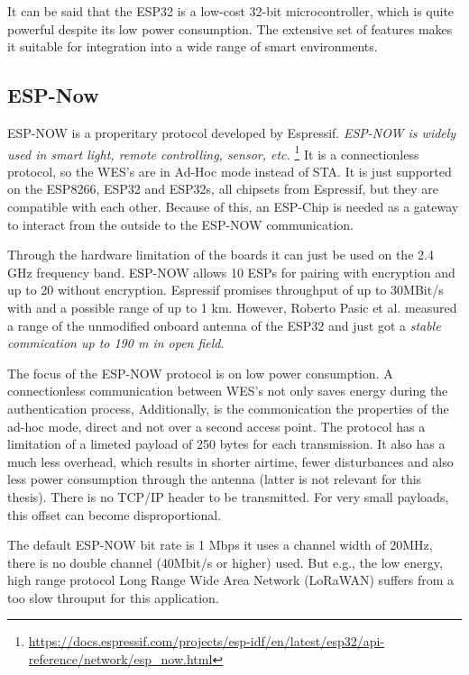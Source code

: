 It can be said that the ESP32 is a low-cost 32-bit microcontroller,
which is quite powerful despite its low power consumption.
The extensive set of features makes it suitable for integration into a wide range of smart environments.
\cite{TheWorkingPrincipalsOfESP32}

\subsection*{ESP-Now}
\label{sub:espnow}
ESP-NOW is a properitary protocol developed by Espressif. 
\emph{ESP-NOW is widely used in smart light, remote controlling, sensor, etc.}
\footnote{\url{https://docs.espressif.com/projects/esp-idf/en/latest/esp32/api-reference/network/esp_now.html}\label{note:espressif}}
It is a connectionless protocol, so the \ac{WES}'s are in Ad-Hoc mode instead of \ac{STA}.
It is just supported on the ESP8266, ESP32 and ESP32s, all chipsets from Espressif, but they are compatible with each other.
Because of this, an ESP-Chip is needed as a gateway to interact from the outside to the ESP-NOW communication. 

Through the hardware limitation of the boards it can just be used on the 2.4 GHz frequency band.
ESP-NOW allows 10 ESPs for pairing with encryption and up to 20 without encryption.
Espressif promises throughput of up to 30MBit/s with and a possible range of up to 1 km.
However, Roberto Pasic et al. \cite{ESPNOWCommunication} measured a range of the unmodified onboard antenna of the ESP32 
and just got a \emph{stable commication up to 190 m in open field}.

The focus of the ESP-NOW protocol is on low power consumption.
A connectionless communication between \ac{WES}'s not only saves energy during the authentication process, 
Additionally, is the commonication the properties of the ad-hoc mode, direct and not over a second access point.
The protocol has a limitation of a limeted payload of 250 bytes for each transmission.
It also has a much less overhead, which results in shorter airtime, fewer disturbances and also less power consumption through the antenna 
(latter is not relevant for this thesis).
There is no TCP/IP header to be transmitted. 
For very small payloads, this offset can become disproportional.

The default ESP-NOW bit rate is 1 Mbps it uses a channel width of 20MHz, there is no double channel (40Mbit/s or higher) used.
But e.g., the low energy, high range protocol Long Range Wide Area Network (LoRaWAN) suffers from a too slow throuput for this application.

